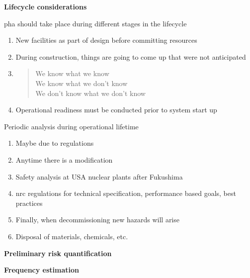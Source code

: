 \documentclass[aspectratio=1610,pdftex,dvipsnames,compress,xcolor={dvipsnames}]{beamer}
\newcommand{\acs}{\acrshort} %
\begin{document}
\begin{frame}[plain]{}
    \centering\LARGE\textbf{Lifecycle considerations}
\end{frame}


\addtocounter{framenumber}{-1}
\begin{frame}{\acs{pha} should take place during different stages in the lifecycle}
    \begin{enumerate}[series=outerlist,topsep=0pt,itemsep=21pt,leftmargin=*,label=(\arabic*)]
        \item[]New facilities as part of design before committing resources
        \item[]During construction, things are going to come up that were not anticipated
        \item[]\begin{quote}We know what we know\\We know what we don't know\\We don't know what we don't know\end{quote}
        \item[]Operational readiness must be conducted prior to system start up
    \end{enumerate}
\end{frame}


\begin{frame}{Periodic analysis during operational lifetime}
    \begin{enumerate}[series=outerlist,topsep=0pt,itemsep=15pt,leftmargin=*,label=(\arabic*)]
        \item[]Maybe due to regulations
        \item[]Anytime there is a modification  
        \item[]Safety analysis at USA nuclear plants after Fukushima
        \item[]\acs{nrc} regulations for technical specification, performance based goals, best practices
        \item[]Finally, when decommissioning new hazards will arise
        \item[]Disposal of materials, chemicals, etc.
    \end{enumerate}
\end{frame}


\begin{frame}[plain]{}
    \centering\LARGE\textbf{Preliminary risk quantification}
\end{frame}


\begin{frame}[plain]{}
    \centering\LARGE\textbf{Frequency estimation}
\end{frame}
\end{document}
